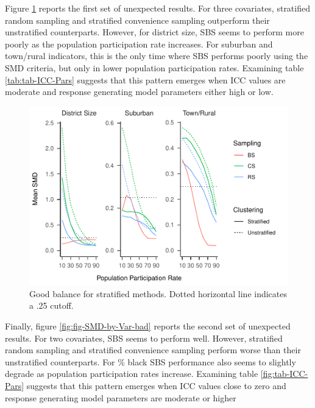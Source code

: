 \documentclass[man,floatsintext]{apa6}
\begin{document}
Figure \ref{fig:fig-SMD-by-Var-good2} reports the first set of unexpected results. For three covariates, stratified random sampling and stratified convenience sampling outperform their unstratified counterparts. However, for district size, SBS seems to perform more poorly as the population participation rate increases. For suburban and town/rural indicators, this is the only time where SBS performs poorly using the SMD criteria, but only in lower population participation rates. Examining table \ref{tab:tab-ICC-Pars} suggests that this pattern emerges when ICC values are moderate and response generating model parameters either high or low.



\begin{figure}
\centering
\includegraphics{GenSamp-Paper_files/figure-latex/fig-SMD-by-Var-good2-1.pdf}
\caption{\label{fig:fig-SMD-by-Var-good2}Good balance for stratified methods. Dotted horizontal line indicates a .25 cutoff.}
\end{figure}

Finally, figure \ref{fig:fig-SMD-by-Var-bad} reports the second set of unexpected results. For two covariates, SBS seems to perform well. However, stratified random sampling and stratified convenience sampling perform worse than their unstratified counterparts. For \% black SBS performance also seems to slightly degrade as population participation rates increase. Examining table \ref{fig:tab-ICC-Pars} suggests that this pattern emerges when ICC values close to zero and response generating model parameters are moderate or higher
\end{document}
